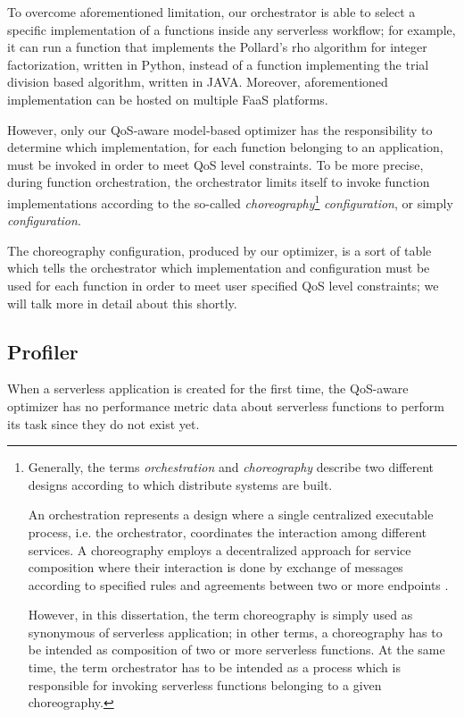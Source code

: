 \documentclass[12pt,a4paper]{report}
\begin{document}
To overcome aforementioned limitation, our orchestrator is able to select a specific implementation of a functions inside any serverless workflow; for example, it can run a function that implements the Pollard's rho algorithm for integer factorization, written in Python, instead of a function implementing the trial division based algorithm, written in JAVA. Moreover, aforementioned implementation can be hosted on multiple FaaS platforms.

However, only our QoS-aware model-based optimizer has the responsibility to determine which implementation, for each function belonging to an application, must be invoked in order to meet QoS level constraints. To be more precise, during function orchestration, the orchestrator limits itself to invoke function implementations according to the so-called \textit{choreography}\footnote{Generally, the terms \textit{orchestration} and \textit{choreography} describe two different designs according to which distribute systems are built. 
	
	An orchestration represents a design where a single centralized executable process, i.e. the orchestrator, coordinates the interaction among different services. A choreography employs a decentralized approach for service composition where their interaction is done by exchange of messages according to specified rules and agreements between two or more endpoints \cite{orchestration}. 
	
	However, in this dissertation, the term choreography is simply used as synonymous of serverless application; in other terms, a choreography has to be intended as composition of two or more serverless functions. At the same time, the term orchestrator has to be intended as a process which is responsible for invoking serverless functions belonging to a given choreography.} \textit{configuration}, or simply \textit{configuration}.

The choreography configuration, produced by our optimizer, is a sort of table which tells the orchestrator which implementation and configuration must be used for each function in order to meet user specified QoS level constraints; we will talk more in detail about this shortly.

\subsection{Profiler}

When a serverless application is created for the first time, the QoS-aware optimizer has no performance metric data about serverless functions to perform its task since they do not exist yet. 
\end{document}
